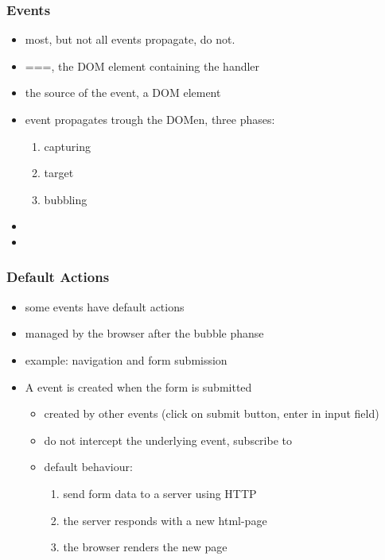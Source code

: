 \begin{frame}[fragile]
\frametitle{Events}
\color{structure}

\begin{itemize}\color{structure}
\item most, but not all events propagate,  do not.
\item {}===, the DOM element containing the handler
\item {} the source of the event, a DOM element
\item event propagates trough the DOMen, three phases:
  \begin{enumerate}
    \item capturing
    \item target
    \item bubbling
  \end{enumerate}
\item {}
\item {}
\end{itemize}

\end{frame}

\begin{frame}[fragile]
\frametitle{Default Actions}
\color{structure}
\begin{itemize}
  \item some events have default actions
  \item managed by the browser after the bubble phanse
  \item example: navigation and form submission
  \item A  event is created when the form is submitted
\begin{itemize}
  \item created by other events (click on submit button, enter in input field)
  \item do not intercept the underlying event, subscribe to 
  \item default behaviour:
  \begin{enumerate}
    \item send form data to a server using HTTP
    \item the server responds with a new html-page
    \item the browser renders the new page
  \end{enumerate}
\end{itemize}
\end{itemize}

\end{frame}
